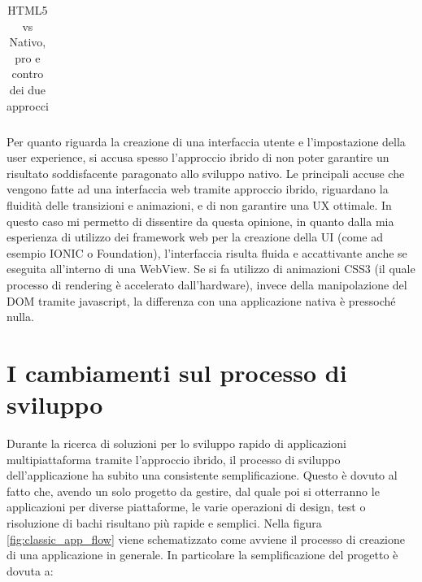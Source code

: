\begin{table}[h]
\begin{tabular}{|p{7.5cm}p{7.5cm}|}
	\end{tabular}
	\caption{HTML5 vs Nativo, pro e contro dei due approcci}
	\label{tbl:html5_vs_native}
\end{table}

Per quanto riguarda la creazione di una interfaccia utente e l'impostazione della user experience, si accusa spesso l'approccio ibrido di non poter garantire un risultato soddisfacente paragonato allo sviluppo nativo. Le principali accuse che vengono fatte ad una interfaccia web tramite approccio ibrido, riguardano la fluidità delle transizioni e animazioni, e di non garantire una UX ottimale. In questo caso mi permetto di dissentire da questa opinione, in quanto dalla mia esperienza di utilizzo dei framework web per la creazione della UI (come ad esempio IONIC o Foundation), l'interfaccia risulta fluida e accattivante anche se eseguita all'interno di una WebView. Se si fa utilizzo di animazioni CSS3 (il quale processo di rendering è accelerato dall'hardware), invece della manipolazione del DOM tramite javascript, la differenza con una applicazione nativa è pressoché nulla.

\section{I cambiamenti sul processo di sviluppo}
Durante la ricerca di soluzioni per lo sviluppo rapido di applicazioni multipiattaforma tramite l'approccio ibrido, il processo di sviluppo dell'applicazione ha subito una consistente semplificazione. Questo è dovuto al fatto che, avendo un solo progetto da gestire, dal quale poi si otterranno le applicazioni per diverse piattaforme, le varie operazioni di design, test o risoluzione di bachi risultano più rapide e semplici. Nella figura \ref{fig:classic_app_flow} viene schematizzato come avviene il processo di creazione di una applicazione in generale. In particolare la semplificazione del progetto è dovuta a:

